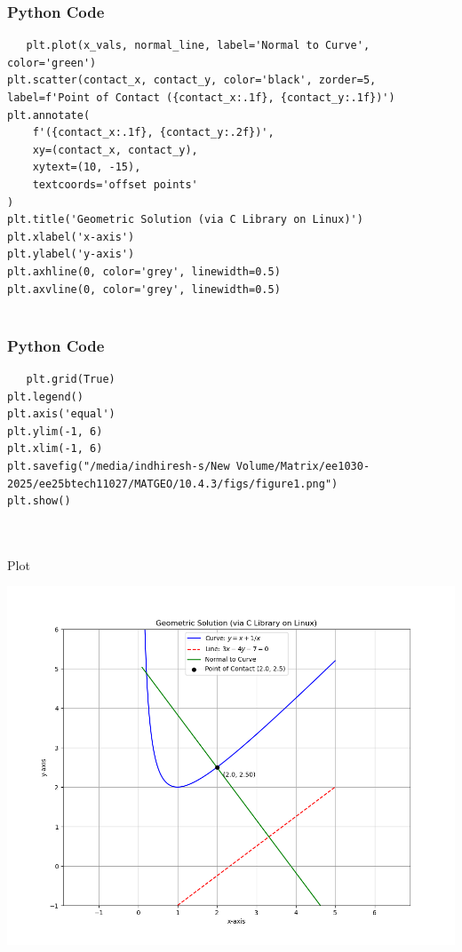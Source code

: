\documentclass{beamer}
\begin{document}
    \begin{frame}[fragile]
        \frametitle{Python Code}
        \begin{lstlisting}
   plt.plot(x_vals, normal_line, label='Normal to Curve', color='green')
plt.scatter(contact_x, contact_y, color='black', zorder=5, label=f'Point of Contact ({contact_x:.1f}, {contact_y:.1f})')
plt.annotate(
    f'({contact_x:.1f}, {contact_y:.2f})',
    xy=(contact_x, contact_y),             
    xytext=(10, -15),                   
    textcoords='offset points'          
)
plt.title('Geometric Solution (via C Library on Linux)')
plt.xlabel('x-axis')
plt.ylabel('y-axis')
plt.axhline(0, color='grey', linewidth=0.5)
plt.axvline(0, color='grey', linewidth=0.5)


        \end{lstlisting}
    \end{frame}

    \begin{frame}[fragile]
        \frametitle{Python Code}
        \begin{lstlisting}
   plt.grid(True)
plt.legend()
plt.axis('equal')
plt.ylim(-1, 6)
plt.xlim(-1, 6)
plt.savefig("/media/indhiresh-s/New Volume/Matrix/ee1030-2025/ee25btech11027/MATGEO/10.4.3/figs/figure1.png")
plt.show()
    
   
        \end{lstlisting}
    \end{frame}

    
    
    \begin{frame}{Plot}
        \begin{center}
            \includegraphics[width=\columnwidth, height=0.8\textheight, keepaspectratio]{figs/figure1.png}
        \end{center}
    \end{frame}
    
    
\end{document}
